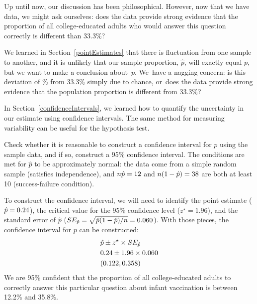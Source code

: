 Up until now, our discussion has been philosophical.
However, now that we have data, we might ask ourselves:
does the data provide strong evidence that the proportion
of all college-educated adults who would answer this
question correctly is different than 33.3\%?

We learned in Section~\ref{pointEstimates} that there is
fluctuation from one sample to another, and it is unlikely
that our sample proportion, $\hat{p}$,
will exactly equal $p$, but we want to make
a conclusion about~$p$.
We~have a nagging concern:
is this deviation of \roslingApercent{}\%
from 33.3\% simply due to chance,
or~does the data provide strong evidence that the
population proportion is different from 33.3\%?

In Section~\ref{confidenceIntervals}, we learned how to
quantify the uncertainty in our estimate using confidence
intervals. 
The same method for measuring variability can be useful
for the hypothesis test.

\begin{examplewrap}
\begin{nexample}{Check whether it is reasonable to construct
    a confidence interval for $p$ using the sample data, and
    if so, construct a 95\% confidence interval.}
  The conditions are met for $\hat{p}$ to be approximately
  normal: the data come from a simple random sample (satisfies
  independence), and $n\hat{p} = 12$ and
  $n(1 - \hat{p}) = 38$ are both
  at least 10 (success-failure condition).

  To construct the confidence interval, we will need to identify
  the point estimate ($\hat{p} = 0.24$),
  the critical value for
  the 95\% confidence level ($z^{\star} = 1.96$), and the standard
  error of $\hat{p}$
  ($SE_{\hat{p}} = \sqrt{\hat{p}(1 - \hat{p}) / n} = 0.060$).
  With those pieces, the confidence interval for $p$ can be
  constructed:
  \begin{align*}
    &\hat{p} \pm z^{\star} \times SE_{\hat{p}} \\
    &0.24 \pm 1.96 \times 0.060 \\
    &(0.122, 0.358)
  \end{align*}
  We are 95\% confident that the proportion of all
  college-educated adults to correctly answer this
  particular question about infant vaccination is between
  12.2\% and 35.8\%.
\end{nexample}
\end{examplewrap}

